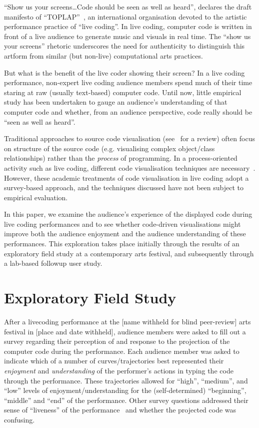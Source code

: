 \documentclass{sig-alternate}
\begin{document}
``Show us your screens\ldots Code should be seen as well as heard'',
declares the draft manifesto of ``TOPLAP''~\cite{Toplap}, an
international organisation devoted to the artistic performance
practice of ``live coding''. In live coding, computer code is written
in front of a live audience to generate music and visuals in real
time. The ``show us your screens'' rhetoric underscores the need for
authenticity to distinguish this artform from similar (but non-live)
computational arts practices.

But what is the benefit of the live coder showing their screen? In a
live coding performance, non-expert live coding audience members spend
much of their time staring at raw (usually text-based) computer code.
Until now, little empirical study has been undertaken to gauge an
audience's understanding of that computer code and whether, from an
audience perspective, code really should be ``seen as well as heard''.

Traditional approaches to source code visualisation
(see~\cite{Novais2013} for a review) often focus on structure of the
source code (e.g. visualising complex object/class relationships)
rather than the \emph{process} of programming. In a process-oriented
activity such as live coding, different code visualisation techniques
are necessary~\cite{McLean2010b,Magnusson2013}. However, these
academic treatments of code visualisation in live coding adopt a
survey-based approach, and the techniques discussed have not been
subject to empirical evaluation.

In this paper, we examine the audience's experience of the displayed
code during live coding performances and to see whether code-driven
visualisations might improve both the audience enjoyment and the
audience understanding of these performances. This exploration takes
place initially through the results of an exploratory field study at a
contemporary arts festival, and subsequently through a lab-based
followup user study.

\section{Exploratory Field Study}

After a livecoding performance at the [name withheld for blind
peer-review] arts festival in [place and date withheld], audience
members were asked to fill out a survey regarding their perception of
and response to the projection of the computer code during the
performance. Each audience member was asked to indicate which of a
number of curves/trajectories best represented their \emph{enjoyment}
and \emph{understanding} of the performer's actions in typing the code
through the performance. These trajectories allowed for ``high'',
``medium'', and ``low'' levels of enjoyment/understanding for the
(self-determined) ``beginning'', ``middle'' and ``end'' of the
performance. Other survey questions addressed their sense of
``liveness'' of the performance~\cite[TODO page number?]{Auslander}
and whether the projected code was confusing.
\end{document}
